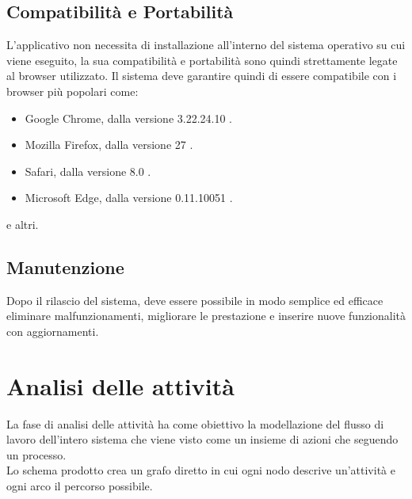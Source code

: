 \subsection{Compatibilità e Portabilità}
L'applicativo non necessita di installazione all'interno del sistema operativo su cui viene eseguito, la sua compatibilità e portabilità sono quindi strettamente legate al browser utilizzato. Il sistema deve garantire quindi di essere compatibile con i browser più popolari \cite{browsers} come:
\begin{itemize}
  \item Google Chrome, dalla versione 3.22.24.10 \cite{chrome}.
  \item Mozilla Firefox, dalla versione 27 \cite{firefox}.
  \item Safari, dalla versione 8.0 \cite{safari}.
  \item Microsoft Edge, dalla versione 0.11.10051 \cite{edge}.
\end{itemize}
e altri.



\subsection{Manutenzione}
Dopo il rilascio del sistema, deve essere possibile in modo semplice ed efficace eliminare malfunzionamenti, migliorare le prestazione e inserire nuove funzionalità con aggiornamenti.

\section{Analisi delle attività}
\label{sec:contesto}
La fase di analisi delle attività ha come obiettivo la modellazione del flusso di lavoro dell'intero sistema che viene visto come un insieme di azioni che seguendo un processo.\\
Lo schema prodotto crea un grafo diretto in cui ogni nodo descrive un'attività e ogni arco il percorso possibile.  

